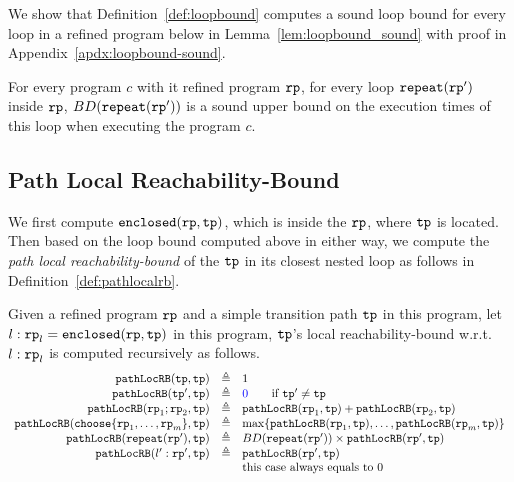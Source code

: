We show that Definition~\ref{def:loopbound} computes a sound loop bound for every loop in a refined program below in Lemma~\ref{lem:loopbound_sound} with proof in Appendix~\ref{apdx:loopbound-sound}.
\begin{lem}
  \label{lem:loopbound_sound}
  For every program $c$ with it refined program $\mathtt{rp}$,
  for every loop $\mathtt{repeat}(\mathtt{rp}')$ inside $\mathtt{rp}$, 
  $BD(\mathtt{repeat}(\mathtt{rp}'))$ is a sound upper bound on the execution times of this loop when executing the program $c$.
\end{lem}
\subsection{Path Local Reachability-Bound}
We first compute $\mathtt{enclosed}(\mathtt{rp}, \mathtt{tp})$, which is  inside the $\mathtt{rp}$, where $\mathtt{tp}$ is located.
Then based on the loop bound computed above in either way, we compute the \emph{path local reachability-bound} of
the $\mathtt{tp}$ in its closest nested loop as follows in Definition~\ref{def:pathlocalrb}.
\begin{defn}
    \label{def:pathlocalrb}
    Given a refined program $\mathtt{rp}$ and a simple transition path $\mathtt{tp}$ in this program, 
    let $l: \mathtt{rp}_l = \mathtt{enclosed}(\mathtt{rp}, \mathtt{tp})$ in this program,
    $\mathtt{tp}$'s local reachability-bound w.r.t. $l: \mathtt{rp}_l$
    is computed recursively as follows. 
  \[
    \begin{array}{rcl}
      \outinB(\tpath, \tpath) & \triangleq & 1 \\
      \outinB(\tpath', \tpath) & \triangleq & \highlight{0} \qquad \text{if } \tpath' \neq \tpath\\
      \outinB(\rprog_1;\rprog_2, \tpath) & \triangleq & \outinB(\rprog_1, \tpath) + \outinB(\rprog_2, \tpath) \\
      \outinB(\rpchoose{\rprog_1, \ldots, \rprog_m }, \tpath) & \triangleq 
      & \max\left\{ \outinB(\rprog_1, \tpath), \ldots, \outinB(\rprog_m, \tpath) \right\} \\
      \outinB(\rprepeat(\rprog'), \tpath) & \triangleq 
      & BD(\rprepeat(\rprog'))
       \times \outinB(\rprog', \tpath)
       \\
      \outinB(l': \rprog', \tpath) & \triangleq & \outinB(\rprog', \tpath) \\
      &  & \text{this case always equals to } 0 \\
    \end{array}
    \]
\end{defn}
